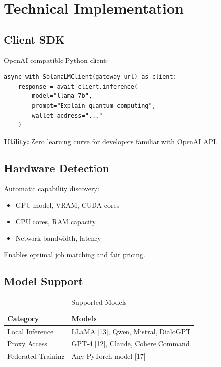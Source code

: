 \documentclass[11pt,a4paper]{article}
\begin{document}
\section{Technical Implementation}

\subsection{Client SDK}

OpenAI-compatible Python client:

\begin{verbatim}
async with SolanaLMClient(gateway_url) as client:
    response = await client.inference(
        model="llama-7b",
        prompt="Explain quantum computing",
        wallet_address="..."
    )
\end{verbatim}

\textbf{Utility:} Zero learning curve for developers familiar with OpenAI API.

\subsection{Hardware Detection}

Automatic capability discovery:

\begin{itemize}
    \item GPU model, VRAM, CUDA cores
    \item CPU cores, RAM capacity
    \item Network bandwidth, latency
\end{itemize}

Enables optimal job matching and fair pricing.

\subsection{Model Support}

\begin{table}[H]
\centering
\begin{tabular}{@{}ll@{}}
\toprule
\textbf{Category} & \textbf{Models} \\
\midrule
Local Inference & LLaMA [13], Qwen, Mistral, DialoGPT \\
Proxy Access & GPT-4 [12], Claude, Cohere Command \\
Federated Training & Any PyTorch model [17] \\
\bottomrule
\end{tabular}
\caption{Supported Models}
\end{table}
\end{document}
